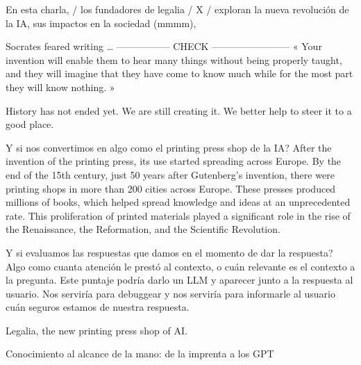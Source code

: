 En esta charla, / los fundadores de legalia / X / exploran la nueva revolución de la IA, sus impactos en la sociedad (mmmm), 



Socrates feared writing … ----------------- CHECK ------------------------
« Your invention will enable them to hear many things without being properly taught, and they will 
imagine that they have come to know much while for the most part they will know nothing. »






History has not ended yet. We are still creating it. We better help to steer it to a good place. 





Y si nos convertimos en algo como el printing press shop de la IA?
After the invention of the printing press, its use started spreading across Europe. By the end of the 15th century, 
just 50 years after Gutenberg's invention, there were printing shops in more than 200 cities across Europe. 
These presses produced millions of books, which helped spread knowledge and ideas at an unprecedented rate. 
This proliferation of printed materials played a significant role in the rise of the Renaissance, the Reformation, and the Scientific Revolution.


Y si evaluamos las respuestas que damos en el momento de dar la respuesta? Algo como cuanta atención le prestó al contexto, o cuán 
relevante es el contexto a la pregunta. Este puntaje podría darlo un LLM y aparecer junto a la respuesta al usuario. 
Nos serviría para debuggear y nos serviría para informarle al usuario cuán seguros estamos de nuestra respuesta. 


Legalia, the new printing press shop of AI. 



Conocimiento al alcance de la mano: de la imprenta a los GPT